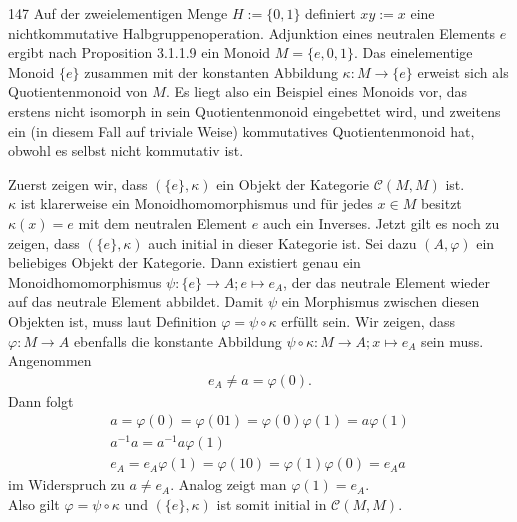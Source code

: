\begin{algebraUE}{147}
Auf der zweielementigen Menge $H := \{0,1\}$ definiert $xy := x$ eine
nichtkommutative Halbgruppenoperation. Adjunktion eines neutralen Elements $e$
ergibt nach Proposition 3.1.1.9 ein Monoid $M = \{e,0,1\}$. Das einelementige
Monoid $\{e\}$ zusammen mit der konstanten Abbildung $\kappa: M \rightarrow \{e\}$
erweist sich als Quotientenmonoid von $M$. Es liegt also ein Beispiel eines
Monoids vor, das erstens nicht isomorph in sein Quotientenmonoid eingebettet
wird, und zweitens ein (in diesem Fall auf triviale Weise) kommutatives
Quotientenmonoid hat, obwohl es selbst nicht kommutativ ist.
\end{algebraUE}
\begin{solution}
Zuerst zeigen wir, dass $(\{e\}, \kappa)$ ein Objekt der Kategorie $\mathcal{C}(M,M)$ ist. \\
$\kappa$ ist klarerweise ein Monoidhomomorphismus und für jedes $x \in M$
besitzt $\kappa(x) = e$ mit dem neutralen Element $e$ auch ein Inverses.
Jetzt gilt es noch zu zeigen, dass $(\{e\}, \kappa)$ auch initial in dieser
Kategorie ist. Sei dazu $(A,\varphi)$ ein beliebiges Objekt der Kategorie.
Dann existiert genau ein Monoidhomomorphismus $\psi: \{e\} \rightarrow A; e \mapsto e_A$,
der das neutrale Element wieder auf das neutrale Element abbildet.
Damit $\psi$ ein Morphismus zwischen diesen Objekten ist, muss laut Definition
$\varphi = \psi \circ \kappa$ erfüllt sein.
Wir zeigen, dass $\varphi: M \rightarrow A$ ebenfalls die konstante Abbildung
$\psi \circ \kappa: M \rightarrow A; x \mapsto e_A$
sein muss.
Angenommen
\begin{align*}
  e_A \neq a = \varphi(0).
\end{align*}
Dann folgt
\begin{align*}
  a = \varphi(0) = \varphi(01) = \varphi(0)\varphi(1) = a\varphi(1) \\
  a^{-1}a = a^{-1}a\varphi(1) \\
  e_A = e_A\varphi(1) = \varphi(10) = \varphi(1)\varphi(0) = e_Aa
\end{align*}
im Widerspruch zu $a \neq e_A$. Analog zeigt man $\varphi(1) = e_A$. \\
Also gilt $\varphi = \psi \circ \kappa$ und $(\{e\}, \kappa)$ ist somit initial
in $\mathcal{C}(M,M)$.
\end{solution}

